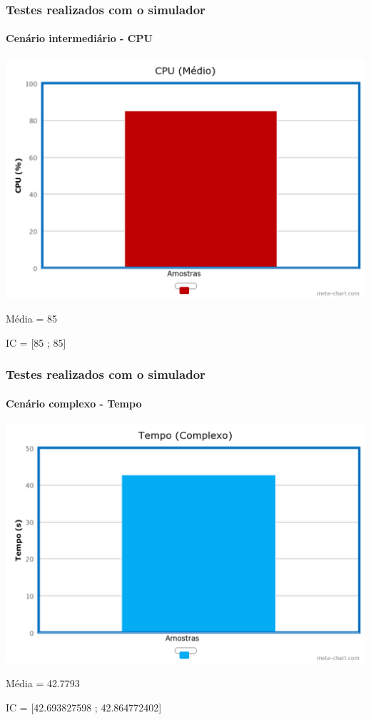 \documentclass{beamer}
\begin{document}
\begin{frame}
	\frametitle{Testes realizados com o simulador}
	\framesubtitle{Cenário intermediário - CPU}
	\begin{center}
	\includegraphics[scale=0.18]{chart(3).png}
	\end{center}
	\begin{center}
	Média = 85
	\end{center}
	\begin{center}
	IC = [85 ; 85]
	\end{center}
\end{frame}

\begin{frame}
	\frametitle{Testes realizados com o simulador}
	\framesubtitle{Cenário complexo - Tempo}
	\begin{center}
	\includegraphics[scale=0.18]{chart(4).png}
	\end{center}
	\begin{center}
	Média = 42.7793
	\end{center}
	\begin{center}
	IC = [42.693827598 ; 42.864772402]
	\end{center}
\end{frame}
\end{document}
